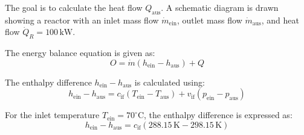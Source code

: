 The goal is to calculate the heat flow \( Q_{\text{aus}} \). A schematic diagram is drawn showing a reactor with an inlet mass flow \( \dot{m}_{\text{ein}} \), outlet mass flow \( \dot{m}_{\text{aus}} \), and heat flow \( \dot{Q}_R = 100 \, \text{kW} \).  

The energy balance equation is given as:  
\[
O = \dot{m} (h_{\text{ein}} - h_{\text{aus}}) + Q
\]  

The enthalpy difference \( h_{\text{ein}} - h_{\text{aus}} \) is calculated using:  
\[
h_{\text{ein}} - h_{\text{aus}} = c_{\text{if}} (T_{\text{ein}} - T_{\text{aus}}) + v_{\text{if}} (p_{\text{ein}} - p_{\text{aus}})
\]  

For the inlet temperature \( T_{\text{ein}} = 70^\circ\text{C} \), the enthalpy difference is expressed as:  
\[
h_{\text{ein}} - h_{\text{aus}} = c_{\text{if}} (288.15 \, \text{K} - 298.15 \, \text{K})
\]